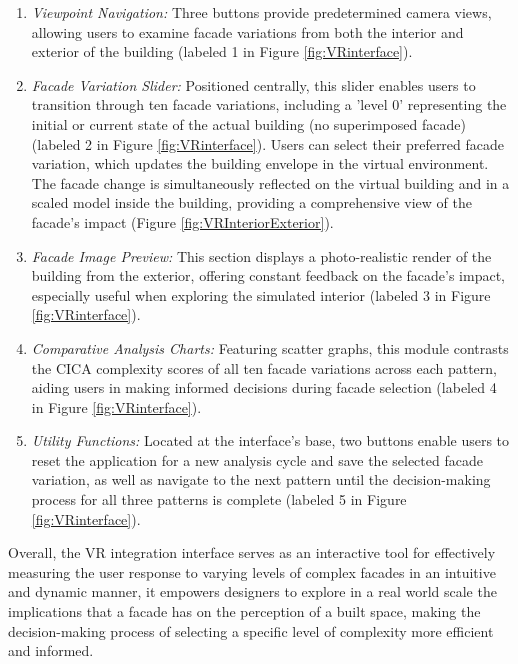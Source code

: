 \begin{enumerate}
\item \textit{Viewpoint Navigation:} Three buttons provide predetermined camera views, allowing users to examine facade variations from both the interior and exterior of the building (labeled 1 in Figure \ref{fig:VRinterface}).

\item \textit{Facade Variation Slider:} Positioned centrally, this slider enables users to transition through ten facade variations, including a 'level 0' representing the initial or current state of the actual building (no superimposed facade) (labeled 2 in Figure \ref{fig:VRinterface}).
Users can select their preferred facade variation, which updates the building envelope in the virtual environment.
The facade change is simultaneously reflected on the virtual building and in a scaled model inside the building, providing a comprehensive view of the facade's impact (Figure \ref{fig:VRInteriorExterior}).

\item \textit{Facade Image Preview:} This section displays a photo-realistic render of the building from the exterior, offering constant feedback on the facade's impact, especially useful when exploring the simulated interior (labeled 3 in Figure \ref{fig:VRinterface}).

\item \textit{Comparative Analysis Charts:} Featuring scatter graphs, this module contrasts the CICA complexity scores of all ten facade variations across each pattern, aiding users in making informed decisions during facade selection (labeled 4 in Figure \ref{fig:VRinterface}).

\item \textit{Utility Functions:} Located at the interface's base, two buttons enable users to reset the application for a new analysis cycle and save the selected facade variation, as well as navigate to the next pattern until the decision-making process for all three patterns is complete (labeled 5 in Figure \ref{fig:VRinterface}).
\end{enumerate}

Overall, the VR integration interface serves as an interactive tool for effectively measuring the user response to varying levels of complex facades in an intuitive and dynamic manner, it empowers designers to explore in a real world scale the implications that a facade has on the perception of a built space, making the decision-making process of selecting a specific level of complexity more efficient and informed.






